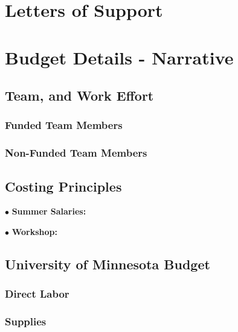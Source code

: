 \documentclass[12pt]{article}
\begin{document}
\newpage
\addtocounter{page}{13}
\section{Letters of Support}
\label{sec:lettersofsupport}

\newpage
\addtocounter{page}{3}
\section{Budget Details - Narrative}
\label{sec:budget}

\subsection{Team, and Work Effort}
\label{sec:budget_principles}


\subsubsection{Funded Team Members}


\subsubsection{Non-Funded Team Members}


\subsection{Costing Principles}
\label{sec:cost_principles}


$\bullet$ \hspace{0.2in} {\bf Summer Salaries:} 


$\bullet$ \hspace{0.2in} {\bf Workshop:} 


        \subsection{University of Minnesota Budget}


            \subsubsection{Direct Labor} 


            \subsubsection{Supplies} 
\end{document}
